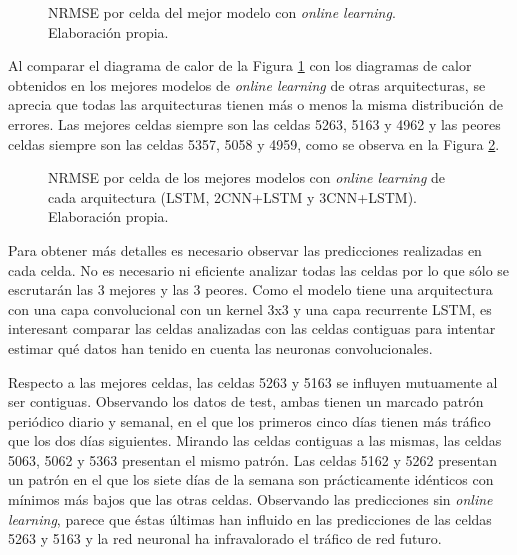 \begin{figure}[h!]
	\centering
	
	\caption{NRMSE por celda del mejor modelo con \textit{online learning}. Elaboración propia.}
	\label{fig:heatmap_bestmodel}
\end{figure}
\FloatBarrier


Al comparar el diagrama de calor de la Figura \ref{fig:heatmap_bestmodel} con los diagramas de calor obtenidos en los mejores modelos de \textit{online learning} de otras arquitecturas, se aprecia que todas las arquitecturas tienen más o menos la misma distribución de errores. Las mejores celdas siempre son las celdas 5263, 5163 y 4962 y las peores celdas siempre son las celdas 5357, 5058 y 4959, como se observa en la Figura \ref{fig:heatmap_combined}.


\begin{figure}[h!]
	\centering
	
	\caption{NRMSE por celda de los mejores modelos con \textit{online learning} de cada arquitectura (LSTM, 2CNN+LSTM y 3CNN+LSTM). Elaboración propia.}
	\label{fig:heatmap_combined}
\end{figure}
\FloatBarrier

Para obtener más detalles es necesario observar las predicciones realizadas en cada celda. No es necesario ni eficiente analizar todas las celdas por lo que sólo se escrutarán las 3 mejores y las 3 peores. Como el modelo tiene una arquitectura con una capa convolucional con un kernel 3x3 y una capa recurrente LSTM, es interesant comparar las celdas analizadas con las celdas contiguas para intentar estimar qué datos han tenido en cuenta las neuronas convolucionales.




Respecto a las mejores celdas, las celdas 5263 y 5163 se influyen mutuamente al ser contiguas. Observando los datos de test, ambas tienen un marcado patrón periódico diario y semanal, en el que los primeros cinco días tienen más tráfico que los dos días siguientes. Mirando las celdas contiguas a las mismas, las celdas 5063, 5062 y 5363 presentan el mismo patrón. Las celdas 5162 y 5262 presentan un patrón en el que los siete días de la semana son prácticamente idénticos con mínimos más bajos que las otras celdas. Observando las predicciones sin \textit{online learning}, parece que éstas últimas han influido en las predicciones de las celdas 5263 y 5163 y la red neuronal ha infravalorado el tráfico de red futuro.


